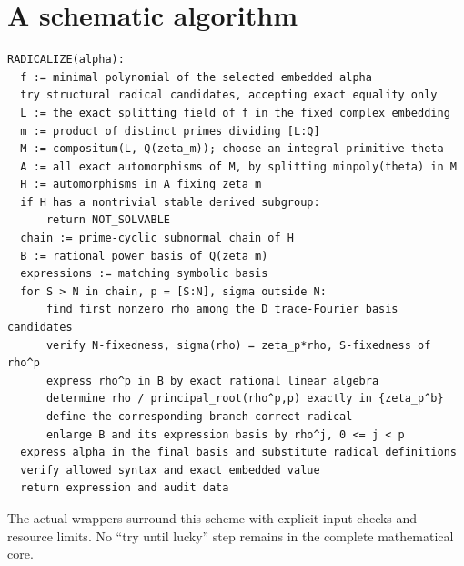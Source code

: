 \documentclass[11pt,a4paper]{article}
\theoremstyle{definition}
\begin{document}
\section{A schematic algorithm}
\begin{lstlisting}
RADICALIZE(alpha):
  f := minimal polynomial of the selected embedded alpha
  try structural radical candidates, accepting exact equality only
  L := the exact splitting field of f in the fixed complex embedding
  m := product of distinct primes dividing [L:Q]
  M := compositum(L, Q(zeta_m)); choose an integral primitive theta
  A := all exact automorphisms of M, by splitting minpoly(theta) in M
  H := automorphisms in A fixing zeta_m
  if H has a nontrivial stable derived subgroup:
      return NOT_SOLVABLE
  chain := prime-cyclic subnormal chain of H
  B := rational power basis of Q(zeta_m)
  expressions := matching symbolic basis
  for S > N in chain, p = [S:N], sigma outside N:
      find first nonzero rho among the D trace-Fourier basis candidates
      verify N-fixedness, sigma(rho) = zeta_p*rho, S-fixedness of rho^p
      express rho^p in B by exact rational linear algebra
      determine rho / principal_root(rho^p,p) exactly in {zeta_p^b}
      define the corresponding branch-correct radical
      enlarge B and its expression basis by rho^j, 0 <= j < p
  express alpha in the final basis and substitute radical definitions
  verify allowed syntax and exact embedded value
  return expression and audit data
\end{lstlisting}
The actual wrappers surround this scheme with explicit input checks and resource
limits. No ``try until lucky'' step remains in the complete mathematical core.
\end{document}
